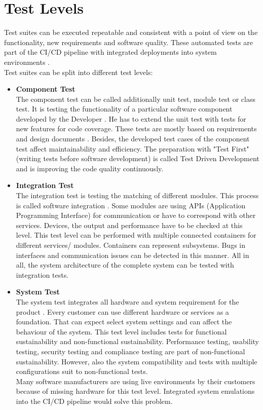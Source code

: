 \section{Test Levels}\label{TestLevel}

Test suites can be executed repeatable and consistent with a point of view on the functionality, new requirements and software quality. These automated tests are part of the \gls{CI/CD} pipeline with integrated deployments into system environments \cite[~p.112]{Scholl2019}. \\
Test suites can be split into different test levels:
\begin{itemize}
\item \textbf{Component Test}  \\
The component test can be called additionally unit test, module test or class test. 
It is testing the functionality of a particular software component developed by the Developer \cite[~p.66]{Spillner2019}.
He has to extend the unit test with tests for new features for code coverage. These tests are mostly based on requirements and design documents \cite[~p.63]{Spillner2019}. Besides, the developed test cases of the component test affect maintainability and efficiency.
The preparation with "Test First" (writing tests before software development) is called Test Driven Development and is improving the code quality continuously.

\item \textbf{Integration Test} \\
The integration test is testing the matching of different modules. This process is called software integration \cite[~p.71]{Spillner2019}. Some modules are using APIs (Application Programming Interface) for communication or have to correspond with other services.
Devices, the output and performance have to be checked at this level.
This test level can be performed with multiple connected containers for different services/ modules. Containers can represent subsystems. Bugs in interfaces and communication issues can be detected in this manner.
All in all, the system architecture of the complete system can be tested with integration tests.

\item \textbf{System Test} \\
The system test integrates all hardware and system requirement for the product \cite[~p.79]{Spillner2019}.
Every customer can use different hardware or services as a foundation. That can expect select system settings and can affect the behaviour of the system.
This test level includes tests for functional sustainability \cite[~p.87]{Spillner2019} and non-functional sustainability.
Performance testing, usability testing, security testing and compliance testing are part of non-functional sustainability. However, also the system compatibility and tests with multiple configurations suit to non-functional tests. \\
Many software manufacturers are using live environments by their customers because of missing hardware for this test level. Integrated system emulations into the \gls{CI/CD} pipeline would solve this problem.


\end{itemize}
